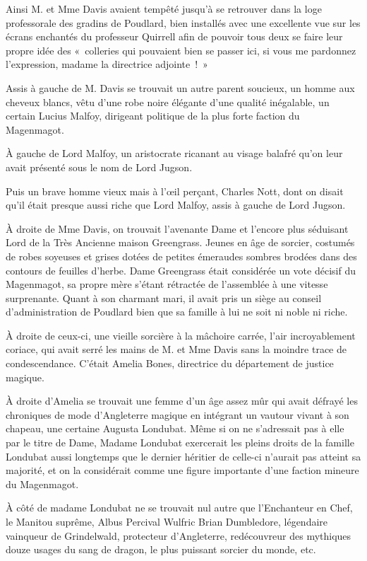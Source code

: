 Ainsi M. et Mme Davis avaient tempêté jusqu'à se retrouver dans la loge professorale des gradins de Poudlard, bien installés avec une excellente vue sur les écrans enchantés du professeur Quirrell afin de pouvoir tous deux se faire leur propre idée des «~colleries qui pouvaient bien se passer ici, si vous me pardonnez l'expression, madame la directrice adjointe~!~»

Assis à gauche de M. Davis se trouvait un autre parent soucieux, un homme aux cheveux blancs, vêtu d'une robe noire élégante d'une qualité inégalable, un certain Lucius Malfoy, dirigeant politique de la plus forte faction du Magenmagot.

À gauche de Lord Malfoy, un aristocrate ricanant au visage balafré qu'on leur avait présenté sous le nom de Lord Jugson.

Puis un brave homme vieux mais à l'œil perçant, Charles Nott, dont on disait qu'il était presque aussi riche que Lord Malfoy, assis à gauche de Lord Jugson.

À droite de Mme Davis, on trouvait l'avenante Dame et l'encore plus séduisant Lord de la Très Ancienne maison Greengrass. Jeunes en âge de sorcier, costumés de robes soyeuses et grises dotées de petites émeraudes sombres brodées dans des contours de feuilles d'herbe. Dame Greengrass était considérée un vote décisif du Magenmagot, sa propre mère s'étant rétractée de l'assemblée à une vitesse surprenante. Quant à son charmant mari, il avait pris un siège au conseil d'administration de Poudlard bien que sa famille à lui ne soit ni noble ni riche.

À droite de ceux-ci, une vieille sorcière à la mâchoire carrée, l'air incroyablement coriace, qui avait serré les mains de M. et Mme Davis sans la moindre trace de condescendance. C'était Amelia Bones, directrice du département de justice magique.

À droite d'Amelia se trouvait une femme d'un âge assez mûr qui avait défrayé les chroniques de mode d'Angleterre magique en intégrant un vautour vivant à son chapeau, une certaine Augusta Londubat. Même si on ne s'adressait pas à elle par le titre de Dame, Madame Londubat exercerait les pleins droits de la famille Londubat aussi longtemps que le dernier héritier de celle-ci n'aurait pas atteint sa majorité, et on la considérait comme une figure importante d'une faction mineure du Magenmagot.

À côté de madame Londubat ne se trouvait nul autre que l'Enchanteur en Chef, le Manitou suprême, Albus Percival Wulfric Brian Dumbledore, légendaire vainqueur de Grindelwald, protecteur d'Angleterre, redécouvreur des mythiques douze usages du sang de dragon, le plus puissant sorcier du monde, etc.

